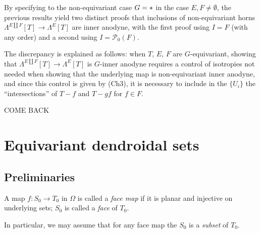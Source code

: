 \documentclass[a4paper,10pt,draft]{article}%
\begin{document}
\begin{remark}\label{TWOPROOF REM}
	By specifying to the non-equivariant case $G = \**$
	in the case $E,F \neq \emptyset$,
	the previous results yield two distinct proofs
	that inclusions of non-equivariant horns
	$\Lambda^{E \amalg F}[T] \to \Lambda^{E}[T]$
	are inner anodyne,
	with the first proof using $I=F$ (with any order) and a second using 
	$I = \mathcal{P}_0(F)$. 
		
	The discrepancy is explained as follows: 
	when $T$, $E$, $F$ are $G$-equivariant, showing that
	$\Lambda^{E \amalg F}[T] \to \Lambda^{E}[T]$ 
	is $G$-inner anodyne requires a control of isotropies 
	not needed when showing that the underlying map is non-equivariant inner anodyne, and since this control is given by (Ch3), it is necessary to include in the $\{U_i\}$ the
	``intersections'' of $T-f$ and $T-gf$ for $f\in F$. 
\end{remark}
















COME BACK


\section{Equivariant dendroidal sets}


\subsection{Preliminaries}







\begin{definition}
      A map $f: S_0 \to T_0$ in $\Omega$ is called a \textit{face map} if it is planar and injective on underlying sets;
      $S_0$ is called a \textit{face} of $T_0$.
\end{definition}

\begin{remark}
      In particular, we may assume that for any face map  the $S_0$ is a \textit{subset} of $T_0$.
\end{remark}
\end{document}
